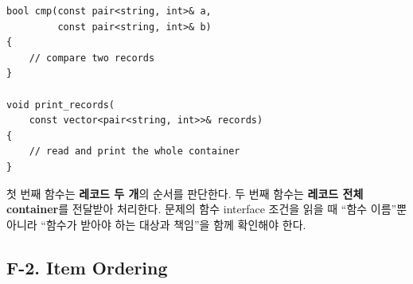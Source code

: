 \begin{lstlisting}
bool cmp(const pair<string, int>& a,
         const pair<string, int>& b)
{
    // compare two records
}

void print_records(
    const vector<pair<string, int>>& records)
{
    // read and print the whole container
}
\end{lstlisting}

첫 번째 함수는 \textbf{레코드 두 개}의 순서를 판단한다. 두 번째 함수는 \textbf{레코드 전체 container}를 전달받아 처리한다. 문제의 함수 interface 조건을 읽을 때 ``함수 이름''뿐 아니라 ``함수가 받아야 하는 대상과 책임''을 함께 확인해야 한다.

\subsection{F-2. Item Ordering}
